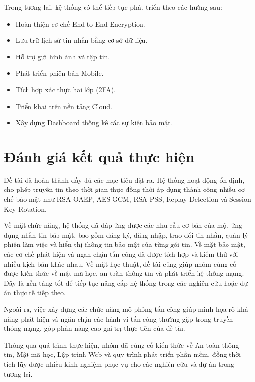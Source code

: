 Trong tương lai, hệ thống có thể tiếp tục phát triển theo các hướng sau:

\begin{itemize}
    \item Hoàn thiện cơ chế End-to-End Encryption.
    \item Lưu trữ lịch sử tin nhắn bằng cơ sở dữ liệu.
    \item Hỗ trợ gửi hình ảnh và tập tin.
    \item Phát triển phiên bản Mobile.
    \item Tích hợp xác thực hai lớp (2FA).
    \item Triển khai trên nền tảng Cloud.
    \item Xây dựng Dashboard thống kê các sự kiện bảo mật.
\end{itemize}

\section{Đánh giá kết quả thực hiện}

Đề tài đã hoàn thành đầy đủ các mục tiêu đặt ra. Hệ thống hoạt động ổn định, cho phép truyền tin theo thời gian thực đồng thời áp dụng thành công nhiều cơ chế bảo mật như RSA-OAEP, AES-GCM, RSA-PSS, Replay Detection và Session Key Rotation.

Về mặt chức năng, hệ thống đã đáp ứng được các nhu cầu cơ bản của một ứng dụng nhắn tin bảo mật, bao gồm đăng ký, đăng nhập, trao đổi tin nhắn, quản lý phiên làm việc và hiển thị thông tin bảo mật của từng gói tin. Về mặt bảo mật, các cơ chế phát hiện và ngăn chặn tấn công đã được tích hợp và kiểm thử với nhiều kịch bản khác nhau. Về mặt học thuật, đề tài cũng giúp nhóm củng cố được kiến thức về mật mã học, an toàn thông tin và phát triển hệ thống mạng. Đây là nền tảng tốt để tiếp tục nâng cấp hệ thống trong các nghiên cứu hoặc dự án thực tế tiếp theo.

Ngoài ra, việc xây dựng các chức năng mô phỏng tấn công giúp minh họa rõ khả năng phát hiện và ngăn chặn các hành vi tấn công thường gặp trong truyền thông mạng, góp phần nâng cao giá trị thực tiễn của đề tài.

Thông qua quá trình thực hiện, nhóm đã củng cố kiến thức về An toàn thông tin, Mật mã học, Lập trình Web và quy trình phát triển phần mềm, đồng thời tích lũy được nhiều kinh nghiệm phục vụ cho các nghiên cứu và dự án trong tương lai.